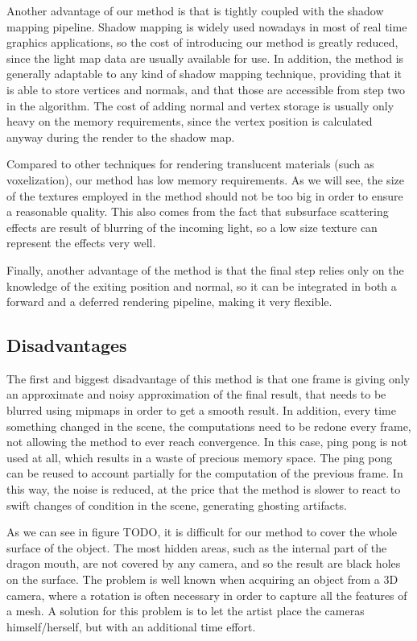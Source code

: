 Another advantage of our method is that is tightly coupled with the shadow mapping pipeline. Shadow mapping is widely used nowadays in most of real time graphics applications, so the cost of introducing our method is greatly reduced, since the light map data are usually available for use. In addition, the method is generally adaptable to any kind of shadow mapping technique, providing that it is able to store vertices and normals, and that those are accessible from step two in the algorithm. The cost of adding normal and vertex storage is usually only heavy on the memory requirements, since the vertex position is calculated anyway during the render to the shadow map. 

Compared to other techniques for rendering translucent materials (such as voxelization), our method has low memory requirements. As we will see, the size of the textures employed in the method should not be too big in order to ensure a reasonable quality. This also comes from the fact that subsurface scattering effects are result of blurring of the incoming light, so a low size texture can represent the effects very well.

Finally, another advantage of the method is that the final step relies only on the knowledge of the exiting position and normal, so it can be integrated in both a forward and a deferred rendering pipeline, making it very flexible.

\subsection{Disadvantages}
The first and biggest disadvantage of this method is that one frame is giving only an approximate and noisy approximation of the final result, that needs to be blurred using mipmaps in order to get a smooth result. In addition, every time something changed in the scene, the computations need to be redone every frame, not allowing the method to ever reach convergence. In this case, ping pong is not used at all, which results in a waste of precious memory space. The ping pong can be reused to account partially for the computation of the previous frame. In this way, the noise is reduced, at the price that the method is slower to react to swift changes of condition in the scene, generating ghosting artifacts.

As we can see in figure TODO, it is difficult for our method to cover the whole surface of the object. The most hidden areas, such as the internal part of the dragon mouth, are not covered by any camera, and so the result are black holes on the surface. The problem is well known when acquiring an object from a 3D camera, where a rotation is often necessary in order to capture all the features of a mesh. A solution for this problem is to let the artist place the cameras himself/herself, but with an additional time effort. 

